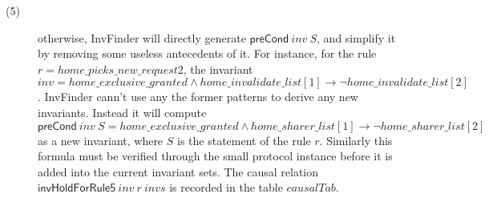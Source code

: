\documentclass{llncs}
\begin{document}
\begin{description}
\item[(5)] otherwise,  {\sf InvFinder} will directly generate  $\mathsf{preCond}~inv~S$,
and simplify it by removing some useless antecedents of it. For instance,
for the rule $r=home\_ picks\_new\_request2$, the invariant
 $inv= home\_exclusive\_granted  \wedge  home\_invalidate\_list[1] \longrightarrow \neg
 home\_invalidate\_list[2]$.
 {\sf InvFinder} cann't use any the former   patterns to derive any new invariants.
 Instead it will compute $\mathsf{preCond}~inv~S=home\_exclusive\_granted  \wedge  home\_sharer\_list[1]
    \longrightarrow  \neg home\_sharer\_list[2]$
  as a new invariant, where $S$ is the statement of the rule $r$. Similarly this formula must be verified
  through the small protocol instance
   before it is added into the current invariant sets. The
causal
    relation $\mathsf{invHoldForRule5}~inv~r~invs$ is   recorded in  the
    table $causalTab$.

\end{description}
\end{document}
